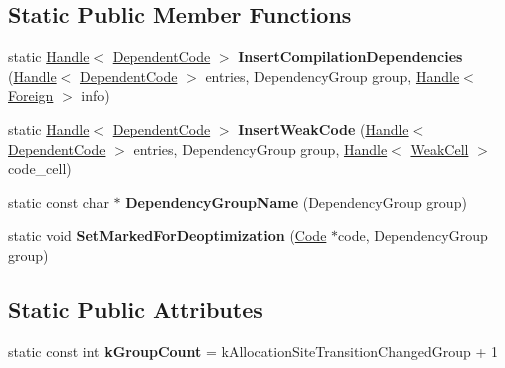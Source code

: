 \subsection*{Static Public Member Functions}
\begin{DoxyCompactItemize}
\item 
static \hyperlink{classv8_1_1internal_1_1_handle}{Handle}$<$ \hyperlink{classv8_1_1internal_1_1_dependent_code}{Dependent\+Code} $>$ {\bfseries Insert\+Compilation\+Dependencies} (\hyperlink{classv8_1_1internal_1_1_handle}{Handle}$<$ \hyperlink{classv8_1_1internal_1_1_dependent_code}{Dependent\+Code} $>$ entries, Dependency\+Group group, \hyperlink{classv8_1_1internal_1_1_handle}{Handle}$<$ \hyperlink{classv8_1_1internal_1_1_foreign}{Foreign} $>$ info)\hypertarget{classv8_1_1internal_1_1_dependent_code_afaf9007a0843b27e48889101bae55c79}{}\label{classv8_1_1internal_1_1_dependent_code_afaf9007a0843b27e48889101bae55c79}

\item 
static \hyperlink{classv8_1_1internal_1_1_handle}{Handle}$<$ \hyperlink{classv8_1_1internal_1_1_dependent_code}{Dependent\+Code} $>$ {\bfseries Insert\+Weak\+Code} (\hyperlink{classv8_1_1internal_1_1_handle}{Handle}$<$ \hyperlink{classv8_1_1internal_1_1_dependent_code}{Dependent\+Code} $>$ entries, Dependency\+Group group, \hyperlink{classv8_1_1internal_1_1_handle}{Handle}$<$ \hyperlink{classv8_1_1internal_1_1_weak_cell}{Weak\+Cell} $>$ code\+\_\+cell)\hypertarget{classv8_1_1internal_1_1_dependent_code_af80177b5b395f6ce1794472c3c287a6f}{}\label{classv8_1_1internal_1_1_dependent_code_af80177b5b395f6ce1794472c3c287a6f}

\item 
static const char $\ast$ {\bfseries Dependency\+Group\+Name} (Dependency\+Group group)\hypertarget{classv8_1_1internal_1_1_dependent_code_a934f45cfae0b04968d0133ca4c7d020c}{}\label{classv8_1_1internal_1_1_dependent_code_a934f45cfae0b04968d0133ca4c7d020c}

\item 
static void {\bfseries Set\+Marked\+For\+Deoptimization} (\hyperlink{classv8_1_1internal_1_1_code}{Code} $\ast$code, Dependency\+Group group)\hypertarget{classv8_1_1internal_1_1_dependent_code_a99c500731c091855cc977f184e15d039}{}\label{classv8_1_1internal_1_1_dependent_code_a99c500731c091855cc977f184e15d039}

\end{DoxyCompactItemize}
\subsection*{Static Public Attributes}
\begin{DoxyCompactItemize}
\item 
static const int {\bfseries k\+Group\+Count} = k\+Allocation\+Site\+Transition\+Changed\+Group + 1\hypertarget{classv8_1_1internal_1_1_dependent_code_a9b2f1109a9b3596bd753ffdc24943f14}{}\label{classv8_1_1internal_1_1_dependent_code_a9b2f1109a9b3596bd753ffdc24943f14}

\end{DoxyCompactItemize}
